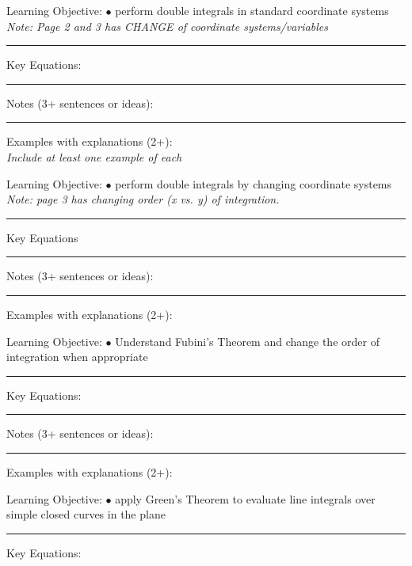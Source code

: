 \documentclass{article}
\theoremstyle{plain}
\theoremstyle{definition}
\theoremstyle{remark}
\begin{document}
\vskip-2pt
\noindent \large Learning Objective:
\normalsize
\vskip0.15in
$\bullet$ perform double integrals in standard coordinate systems\\
\indent \emph{Note: Page 2 and 3 has CHANGE of coordinate systems/variables}
\vskip0.15in
\hrule
\vspace{0.1in}
\large \noindent Key Equations:
\normalsize

\vspace{1in}
\hrule
\vspace{0.1in}
\large \noindent Notes (3+ sentences or ideas):
\normalsize
\vspace{1.75in}
\hrule
\vspace{0.1in}

\large \noindent Examples with explanations (2+):\\
\emph{Include at least one example of each}

\newpage
\noindent \large Learning Objective:
\normalsize
\vskip0.15in
$\bullet$ perform double integrals by changing coordinate systems
\emph{Note: page 3 has changing order (x vs. y) of integration.}
\vskip0.15in
\hrule
\vspace{0.1in}
\large \noindent Key Equations\\
\normalsize

\vspace{1in}
\hrule
\vspace{0.1in}
\large \noindent Notes (3+ sentences or ideas):
\normalsize
\vspace{1.75in}
\hrule
\vspace{0.1in}

\large \noindent Examples with explanations (2+):

\newpage
\noindent \large Learning Objective:
\normalsize
\vskip0.15in
$\bullet$ Understand Fubini's Theorem and change the order of integration when appropriate
\vskip0.15in
\hrule
\vspace{0.1in}
\large \noindent Key Equations:
\normalsize

\vspace{1in}
\hrule
\vspace{0.1in}
\large \noindent Notes (3+ sentences or ideas):
\normalsize
\vspace{1.75in}
\hrule
\vspace{0.1in}

\large \noindent Examples with explanations (2+):\\
\normalsize

\newpage
\noindent \large Learning Objective:
\normalsize
\vskip0.15in
$\bullet$ apply Green's Theorem to evaluate line integrals over simple closed curves in the plane
\vskip0.15in
\hrule
\vspace{0.1in}
\large \noindent Key Equations:
\normalsize
\end{document}
